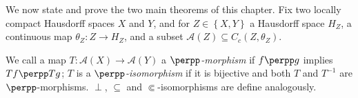 

We now state and prove the two main theorems of this chapter. Fix two locally compact Hausdorff spaces $X$ and $Y$, and for $Z\in\left\{X,Y\right\}$ a Hausdorff space $H_Z$, a continuous map $\theta_Z:Z\to H_Z$, and a subset $\mathcal{A}(Z)\subseteq C_c(Z,\theta_Z)$.

\begin{definition}
We call a map $T:\mathcal{A}(X)\to\mathcal{A}(Y)$ a \emph{$\perpp$-morphism} if $f\perpp g$ implies $Tf\perpp Tg$; $T$ is a \emph{$\perpp$-isomorphism} if it is bijective and both $T$ and $T^{-1}$ are $\perpp$-morphisms. $\perp$, $\subseteq$ and $\Subset$-isomorphisms are define analogously.
\end{definition}


